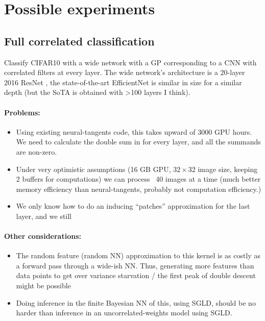 \documentclass{article} %
\begin{document}
\section{Possible experiments}
\subsection{Full correlated classification }
Classify CIFAR10 with a wide network with a GP corresponding to a CNN with
correlated filters at every layer. The wide network's architecture is a 20-layer
2016 ResNet \citep{he2016deep}, the state-of-the-art EfficientNet
\citep{tan19efficientnet} is similar in size for a similar depth (but the SoTA
is obtained with >100 layers I think).

\paragraph{Problems:}
\begin{itemize}
  \item Using existing neural-tangents code, this takes upward of 3000 GPU
    hours. We need to calculate the double sum in  for every
    layer, and all the summands are non-zero.
  \item Under very optimistic assumptions (16 GB GPU, $32\times 32$ image size,
    keeping 2 buffers for computations) we can process ~40 images at a time
    (much better memory efficiency than neural-tangents, probably not
    computation efficiency.)
  \item We only know how to do an inducing ``patches'' approximation for the last
    layer, and we still 
\end{itemize}

\paragraph{Other considerations:}
\begin{itemize}
  \item The random feature (random NN) approximation to this kernel is as costly
    as a forward pass through a wide-ish NN. Thus, generating more 
    features than data points to get over variance starvation / the first peak
    of double descent \citep{belkin18reconciling} might be possible
  \item Doing inference in the finite Bayesian NN of this, using SGLD, should be
    no harder than inference in an uncorrelated-weights model using SGLD.
\end{itemize}
\end{document}
